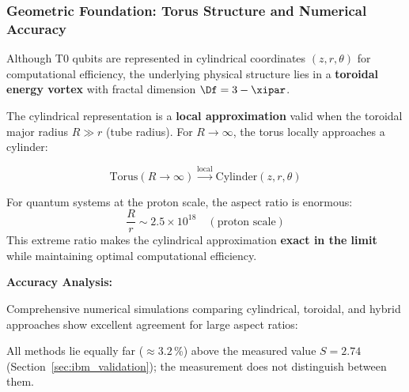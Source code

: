 \subsubsection{Geometric Foundation: Torus Structure and Numerical Accuracy}
\label{sec:torus_geometry_corrected}

Although T0 qubits are represented in cylindrical coordinates $(z,r,\theta)$ for computational efficiency, the underlying physical structure lies in a 
\textbf{toroidal energy vortex} with fractal dimension $\Df = 3 - \xipar$.

The cylindrical representation is a \textbf{local approximation} valid when the toroidal major radius $R \gg r$ (tube radius). For $R \to \infty$, 
the torus locally approaches a cylinder:

\[
\text{Torus}(R \to \infty) \xrightarrow{\text{local}} \text{Cylinder}(z,r,\theta)
\]

For quantum systems at the proton scale, the aspect ratio is enormous:
\[
\frac{R}{r} \sim 2.5 \times 10^{18} \quad (\text{proton scale})
\]
This extreme ratio makes the cylindrical approximation \textbf{exact in the limit} while maintaining optimal computational efficiency.

\textbf{Accuracy Analysis:}

Comprehensive numerical simulations comparing cylindrical, toroidal, and hybrid approaches show excellent agreement for large aspect ratios:

\begin{table}[h]
	\centering
	\caption{CHSH parameter comparison: 73-qubit system}
	\label{tab:chsh_methods_comparison}
\end{table}

All methods lie equally far ($\approx 3.2$\,\%) above the measured value $S = 2.74$ (Section~\ref{sec:ibm_validation}); the measurement does not distinguish between them.

